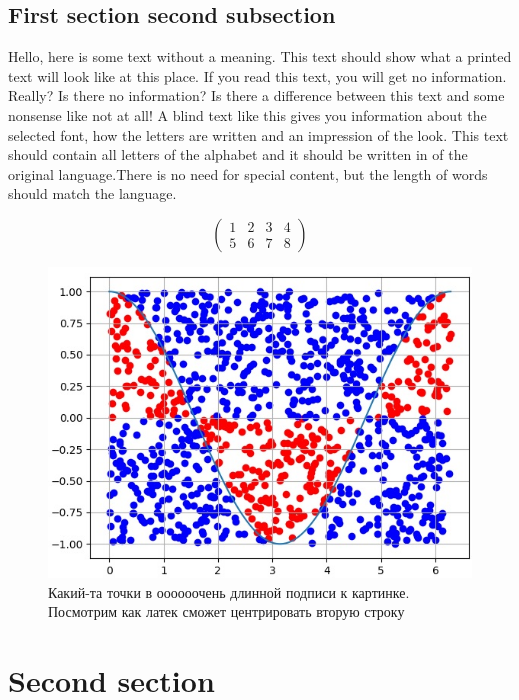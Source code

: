 \documentclass[a4paper,14pt]{extarticle}
\begin{document}
    \subsection{First section second subsection}

    Hello, here is some text without a meaning. This text should show what 
    a printed text will look like at this place. If you read this text, 
    you will get no information.  Really?  Is there no information?  Is there 
    a difference between this text and some nonsense like not at all!  A 
    blind text like this gives you information about the selected font, how 
    the letters are written and an impression of the look.  This text should
    contain all letters of the alphabet and it should be written in of the
    original language.There is no need for special content, but the length of
    words should match the language.

    \begin{equation*}
        \begin{pmatrix}
            1 & 2 & 3 & 4 \\
            5 & 6 & 7 & 8
        \end{pmatrix}
    \end{equation*}

    \begin{figure}[H]
        \includegraphics{Points}
        \caption{Какий-та точки в оооооочень длинной подписи к картинке.
            Посмотрим как латек сможет центрировать вторую строку}
    \end{figure}

    \section{Second section}
\end{document}
